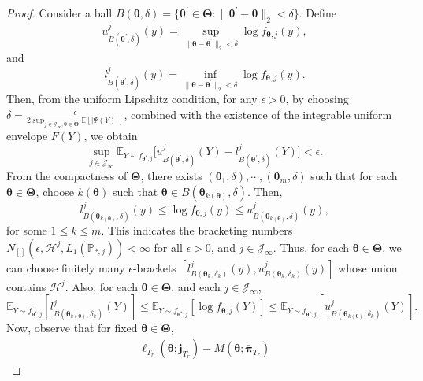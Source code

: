\documentclass[12pt]{article}
\newcommand{\bfTheta}{\boldsymbol{\Theta}}
\newcommand{\bfpi}{\boldsymbol{\pi}}
\newcommand{\bftheta}{\boldsymbol{\theta}}
\begin{document}
\begin{proof}
Consider a ball $B(\bftheta, \delta) = \{\bftheta^{'} \in \bfTheta: \| \bftheta^{'} - \bftheta \|_2 < \delta \}$. Define 
\begin{equation*}
u_{B(\bftheta^{'}, \delta)}^j(y) = \sup_{\|\bftheta - \bftheta^{'}\|_2 < \delta} \log f_{\bftheta, j}(y), 
\end{equation*}
and
\begin{equation*}
l_{B(\bftheta^{'}, \delta)}^j(y) = \inf_{\|\bftheta - \bftheta^{'}\|_2 < \delta} \log f_{\bftheta, j}(y).
\end{equation*}
Then, from the uniform Lipschitz condition, for any $\epsilon > 0$, by choosing $\delta = \frac{\epsilon}{2 \sup_{j \in \mathcal{J}_{\infty}, \bftheta \in \bfTheta} \mathbb{E}[| \Psi(Y)|]}$, combined with the existence of the integrable uniform envelope $F(Y)$, we obtain
\begin{equation*}
\sup_{j \in \mathcal{J}_{\infty}} \mathbb{E}_{Y \sim f_{\bftheta^{\ast}, j}} \Big[ u_{B(\bftheta^{'}, \delta)}^j(Y) - l_{B(\bftheta^{'}, \delta)}^j(Y) \Big] < \epsilon.
\end{equation*}
From the compactness of $\bfTheta$, there exists $(\bftheta_1, \delta), \cdots, (\bftheta_m, \delta)$ such that for each $\bftheta \in \bfTheta$, choose $k(\bftheta)$ such that $\bftheta \in B(\bftheta_{k(\bftheta)}, \delta)$. Then,
\begin{equation*}
l_{B(\bftheta_{k(\bftheta)}, \delta)}^j(y) \le \log f_{\bftheta, j}(y) 
\le u_{B(\bftheta_{k(\bftheta)}, \delta)}^j(y),
\end{equation*}
for some $1 \le k \le m$. This indicates the bracketing numbers $N_{[]}(\epsilon, \mathcal{H}^j, L_1(\mathbb{P}_{\ast,j})) < \infty$ for all $\epsilon > 0$, and $j \in \mathcal{J}_{\infty}$. Thus, for each $\bftheta \in \bfTheta$, we can choose finitely many $\epsilon$-brackets $[l_{B(\bftheta_k, \delta_k)}^j(y), u_{B(\bftheta_k, \delta_k)}^j(y)]$ whose union contains $\mathcal{H}^j$. Also, for each $\bftheta \in \bfTheta$, and each $j \in \mathcal{J}_{\infty}$, 
\begin{equation*}
\mathbb{E}_{Y \sim f_{\bftheta^{\ast}, j}}[ l_{B(\bftheta_{k(\bftheta)}, \delta_k)}^j(Y)] \leq \mathbb{E}_{Y \sim f_{\bftheta^{\ast},j}}[ \log f_{\bftheta, j}(Y)] \leq \mathbb{E}_{Y \sim f_{\bftheta^{\ast}, j}}[ u_{B(\bftheta_{k(\bftheta)}, \delta_k)}^j(Y)].
\end{equation*}
Now, observe that for fixed $\bftheta \in \bfTheta$,
\begin{align*}
\ell_{T_r}(\bftheta; \mathbf{j}_{T_r}) - M(\bftheta; \bar{\bfpi}_{T_r}) 

\end{align*}
\end{proof}
\end{document}
